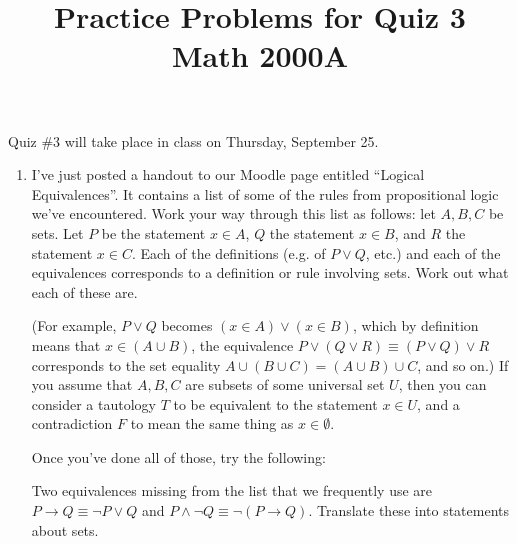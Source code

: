 \documentclass[letterpaper,12pt]{article}
\title{Practice Problems for Quiz 3\\Math 2000A}
\date{}
\begin{document}
 \maketitle
\vspace{-1cm}

Quiz \#3 will take place in class on Thursday, September 25. 
\begin{enumerate}
 \item I've just posted a handout to our Moodle page entitled ``Logical Equivalences''. It contains a list of some of the rules from propositional logic we've encountered. Work your way through this list as follows: let $A,B,C$ be sets. Let $P$ be the statement $x\in A$, $Q$ the statement $x\in B$, and $R$ the statement $x\in C$. Each of the definitions (e.g. of $P\vee Q$, etc.) and each of the equivalences corresponds to a definition or rule involving sets. Work out what each of these are.

(For example, $P\vee Q$ becomes $(x\in A)\vee (x\in B)$, which by definition means that $x\in (A\cup B)$, the equivalence $P\vee (Q\vee R)\equiv (P\vee Q)\vee R$ corresponds to the set equality $A\cup (B\cup C)=(A\cup B)\cup C$, and so on.) If you assume that $A,B,C$ are subsets of some universal set $U$, then you can consider a tautology $T$ to be equivalent to the statement $x\in U$, and a contradiction $F$ to mean the same thing as $x\in \emptyset$.

Once you've done all of those, try the following: 

Two equivalences missing from the list that we frequently use are $P\to Q\equiv \neg P\vee Q$ and $P\wedge \neg Q\equiv \neg (P\to Q)$. Translate these into statements about sets.


\end{enumerate}
\end{document}
